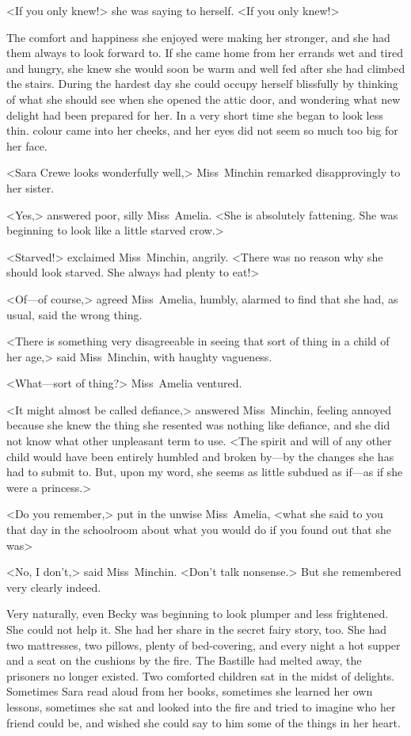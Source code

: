 <If you only knew!> she was saying to herself. <If you only knew!>

The comfort and happiness she enjoyed were making her stronger, and she had them always to look forward to. If she came home from her errands wet and tired and hungry, she knew she would soon be warm and well fed after she had climbed the stairs. During the hardest day she could occupy herself blissfully by thinking of what she should see when she opened the attic door, and wondering what new delight had been prepared for her. In a very short time she began to look less thin. colour came into her cheeks, and her eyes did not seem so much too big for her face.

<Sara Crewe looks wonderfully well,> Miss~Minchin remarked disapprovingly to her sister.

<Yes,> answered poor, silly Miss~Amelia. <She is absolutely fattening. She was beginning to look like a little starved crow.>

<Starved!> exclaimed Miss~Minchin, angrily. <There was no reason why she should look starved. She always had plenty to eat!>

<Of—of course,> agreed Miss~Amelia, humbly, alarmed to find that she had, as usual, said the wrong thing.

<There is something very disagreeable in seeing that sort of thing in a child of her age,> said Miss~Minchin, with haughty vagueness.

<What—sort of thing?> Miss~Amelia ventured.

<It might almost be called defiance,> answered Miss~Minchin, feeling annoyed because she knew the thing she resented was nothing like defiance, and she did not know what other unpleasant term to use. <The spirit and will of any other child would have been entirely humbled and broken by—by the changes she has had to submit to. But, upon my word, she seems as little subdued as if—as if she were a princess.>

<Do you remember,> put in the unwise Miss~Amelia, <what she said to you that day in the schoolroom about what you would do if you found out that she was\longdash>

<No, I don't,> said Miss~Minchin. <Don't talk nonsense.> But she remembered very clearly indeed.

Very naturally, even Becky was beginning to look plumper and less frightened. She could not help it. She had her share in the secret fairy story, too. She had two mattresses, two pillows, plenty of bed-covering, and every night a hot supper and a seat on the cushions by the fire. The Bastille had melted away, the prisoners no longer existed. Two comforted children sat in the midst of delights. Sometimes Sara read aloud from her books, sometimes she learned her own lessons, sometimes she sat and looked into the fire and tried to imagine who her friend could be, and wished she could say to him some of the things in her heart.

